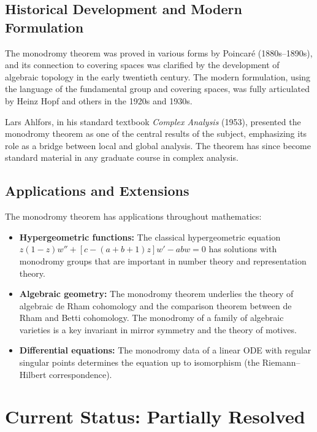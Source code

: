 \subsection{Historical Development and Modern Formulation}

The monodromy theorem was proved in various forms by Poincar\'e (1880s--1890s), and its connection to covering spaces was clarified by the development of algebraic topology in the early twentieth century. The modern formulation, using the language of the fundamental group and covering spaces, was fully articulated by Heinz Hopf and others in the 1920s and 1930s.

Lars Ahlfors, in his standard textbook \emph{Complex Analysis} (1953), presented the monodromy theorem as one of the central results of the subject, emphasizing its role as a bridge between local and global analysis. The theorem has since become standard material in any graduate course in complex analysis.

\subsection{Applications and Extensions}

The monodromy theorem has applications throughout mathematics:

\begin{itemize}
    \item \textbf{Hypergeometric functions:} The classical hypergeometric equation $z(1-z)w'' + [c - (a+b+1)z]w' - abw = 0$ has solutions with monodromy groups that are important in number theory and representation theory.
    \item \textbf{Algebraic geometry:} The monodromy theorem underlies the theory of algebraic de Rham cohomology and the comparison theorem between de Rham and Betti cohomology. The monodromy of a family of algebraic varieties is a key invariant in mirror symmetry and the theory of motives.
    \item \textbf{Differential equations:} The monodromy data of a linear ODE with regular singular points determines the equation up to isomorphism (the Riemann--Hilbert correspondence).
\end{itemize}

\section{Current Status: Partially Resolved}

